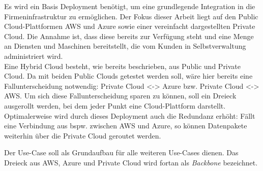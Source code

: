 Es wird ein Basis Deployment benötigt, um eine grundlegende Integration in die Firmeninfrastruktur zu ermöglichen.
Der Fokus dieser Arbeit liegt auf den Public Cloud-Plattformen AWS und Azure sowie einer vereinfacht dargestellten Private Cloud. Die Annahme ist, dass diese bereits zur Verfügung steht und eine Menge an Diensten und Maschinen bereitstellt, die vom Kunden in Selbstverwaltung administriert wird.\\
Eine Hybrid Cloud besteht, wie bereits beschrieben, aus Public und Private Cloud. Da mit beiden Public Clouds getestet werden soll, wäre hier bereits eine Fallunterscheidung notwendig: Private Cloud <-> Azure bzw. Private Cloud <-> AWS. Um sich diese Fallunterscheidung sparen zu können, soll ein Dreieck ausgerollt werden, bei dem jeder Punkt eine Cloud-Plattform darstellt.
Optimalerweise wird durch dieses Deployment auch die Redundanz erhöht: Fällt eine Verbindung aus bspw. zwischen AWS und Azure, so können Datenpakete weiterhin über die Private Cloud geroutet werden.


Der Use-Case soll als Grundaufbau für alle weiteren Use-Cases dienen. Das Dreieck aus AWS, Azure und Private Cloud wird fortan als \textit{Backbone} bezeichnet.

